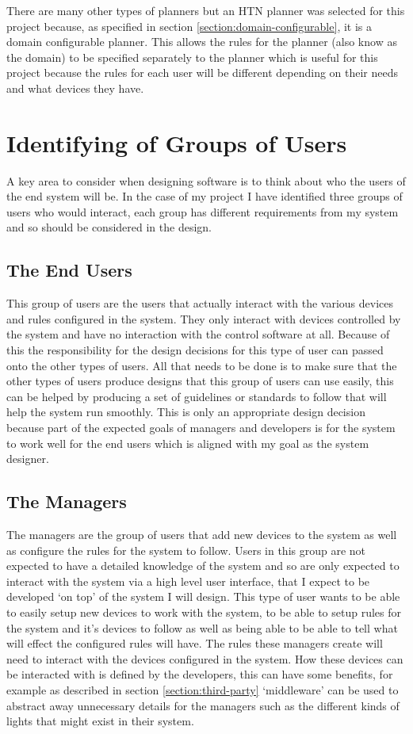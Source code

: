 There are many other types of planners but an HTN planner was selected for this
project because, as specified in section \ref{section:domain-configurable}, it
is a domain configurable planner. This allows the rules for the planner (also
know as the domain) to be specified separately to the planner which is useful
for this project because the rules for each user will be different depending on
their needs and what devices they have.

\section{Identifying of Groups of Users}
A key area to consider when designing software is to think about who the users
of the end system will be. In the case of my project I have identified three
groups of users who would interact, each group has different requirements from
my system and so should be considered in the design.

\subsection{The End Users}
This group of users are the users that actually interact with the various
devices and rules configured in the system. They only interact with devices
controlled by the system and have no interaction with the control software at
all. Because of this the responsibility for the design decisions for this type
of user can passed onto the other types of users. All that needs to be done is
to make sure that the other types of users produce designs that this group of
users can use easily, this can be helped by producing a set of guidelines or
standards to follow that will help the system run smoothly. This is only an
appropriate design decision because part of the expected goals of managers and
developers is for the system to work well for the end users which is aligned
with my goal as the system designer.

\subsection{The Managers}
The managers are the group of users that add new devices to the system as well
as configure the rules for the system to follow. Users in this group are not
expected to have a detailed knowledge of the system and so are only expected to
interact with the system via a high level user interface, that I expect to be
developed `on top' of the system I will design. This type of user wants to be
able to easily setup new devices to work with the system, to be able to setup
rules for the system and it's devices to follow as well as being able to be able
to tell what will effect the configured rules will have. The rules these
managers create will need to interact with the devices configured in the system.
How these devices can be interacted with is defined by the developers, this can
have some benefits, for example as described in section
\ref{section:third-party} `middleware' can be used to abstract away unnecessary
details for the managers such as the different kinds of lights that might exist
in their system.

